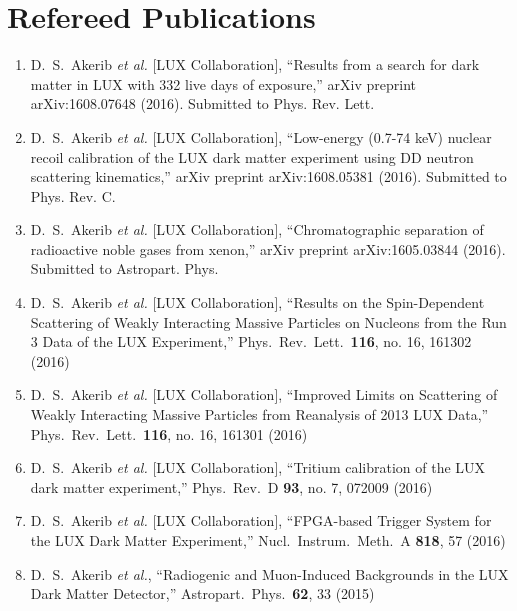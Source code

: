 \documentclass[a4paper,10pt]{article}
\begin{document}
\section{Refereed Publications}
\begin{enumerate}  

\item D.~S.~Akerib {\it et al.} [LUX Collaboration], ``Results from a search for dark matter in LUX with 332 live days of exposure,'' arXiv preprint arXiv:1608.07648 (2016). Submitted to Phys. Rev. Lett.

\item D.~S.~Akerib {\it et al.} [LUX Collaboration],
  ``Low-energy (0.7-74 keV) nuclear recoil calibration of the LUX dark matter experiment using DD neutron scattering kinematics,'' arXiv preprint arXiv:1608.05381 (2016). Submitted to Phys. Rev. C.

\item D.~S.~Akerib {\it et al.} [LUX Collaboration],
  ``Chromatographic separation of radioactive noble gases from xenon,''
  arXiv preprint arXiv:1605.03844 (2016). Submitted to Astropart. Phys.
  
\item   D.~S.~Akerib {\it et al.} [LUX Collaboration],
  ``Results on the Spin-Dependent Scattering of Weakly Interacting Massive Particles on Nucleons from the Run 3 Data of the LUX Experiment,''
  Phys.\ Rev.\ Lett.\  {\bf 116}, no. 16, 161302 (2016)
  
\item   D.~S.~Akerib {\it et al.} [LUX Collaboration],
  ``Improved Limits on Scattering of Weakly Interacting Massive Particles from Reanalysis of 2013 LUX Data,''
  Phys.\ Rev.\ Lett.\  {\bf 116}, no. 16, 161301 (2016)
  
\item   D.~S.~Akerib {\it et al.} [LUX Collaboration],
  ``Tritium calibration of the LUX dark matter experiment,''
  Phys.\ Rev.\ D {\bf 93}, no. 7, 072009 (2016)
  
\item   D.~S.~Akerib {\it et al.} [LUX Collaboration],
  ``FPGA-based Trigger System for the LUX Dark Matter Experiment,''
  Nucl.\ Instrum.\ Meth.\ A {\bf 818}, 57 (2016)
  
\item   D.~S.~Akerib {\it et al.},
  ``Radiogenic and Muon-Induced Backgrounds in the LUX Dark Matter Detector,''
  Astropart.\ Phys.\  {\bf 62}, 33 (2015)
  

\end{enumerate}
\end{document}

